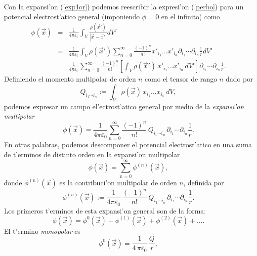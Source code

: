 Con la expansi'on (\ref{exp1or}) podemos reescribir la expresi'on
(\ref{perho}) para un potencial electrost'atico general (imponiendo $\phi=0$ en el infinito) como
\begin{eqnarray}
\phi(\vec x)&=&\frac{1}{4\pi\varepsilon_0}\int_V\frac{\rho(\vec x')}{
\left\vert \vec x-\vec x'\right\vert }dV'\\
&=&\frac{1}{4\pi\varepsilon_0}\int_V \rho(\vec
x')\sum_{n=0}^\infty\frac{(-1)^n}{n!}x'_{i_1}\dots x'_{i_n}\partial_{i_1}\cdots
\partial_{i_n}\frac{1}{r}dV'\\
&=&\frac{1}{4\pi\varepsilon_0}\sum_{n=0}^\infty\frac{(-1)^n}{n!}\left[\int_V
\rho(\vec x')\,x'_{i_1}\dots x'_{i_n}\,dV'\right]\partial_{i_1}\cdots
\partial_{i_n}\frac{1}{r}. \label{phimult}
\end{eqnarray}
Definiendo el momento multipolar de orden $n$ como el tensor de rango $n$ dado
por
\begin{equation}
\boxed{Q_{i_1\cdots i_n}:=\int_V \rho(\vec x)\,x_{i_1}\dots x_{i_n}\,dV,}
\end{equation}
podemos expresar un campo el'ectrost'atico general por medio de la
\textit{expansi'on multipolar}
\begin{equation}
 \boxed{\phi(\vec
x)=\frac{1}{4\pi\varepsilon_0}\sum_{n=0}^\infty\frac{(-1)^n}{n!}\,Q_{ i_1\cdots
i_n}\,\partial_{i_1}\cdots\partial_{i_n}\frac{1}{r}.} \label{phimult2}
\end{equation}
En otras palabras, podemos descomponer el potencial electrost'atico en una suma
de t'erminos de distinto orden en la expansi'on multipolar
\begin{equation}
 \boxed{\phi(\vec{x})=\sum_{n=0}^\infty\phi^{(n)}(\vec{x}),}
\end{equation}
donde $\phi^{(n)}(\vec{x})$ es la contribuci'on multipolar de orden $n$,
definida por
\begin{equation}
\boxed{\phi^{(n)}(\vec{x}):=\frac{1}{4\pi\varepsilon_0}\,\frac{(-1)^n}{n!}\,Q_{
i_1\cdots i_n}\,\partial_{i_1}\cdots\partial_{i_n}\frac{1}{r}.}
\end{equation}
Los primeros t'erminos de esta expansi'on general son de la forma:
\begin{equation} \label{eq3.2.4}
\phi(\vec{x})=\phi^0(\vec{x})+\phi^{(1)}(\vec{x})+\phi^{(2)}(\vec{x})+
\ldots.
\end{equation}
El t'ermino {\em monopolar} es
\begin{equation} \label{eq3.2.5}
\phi^0(\vec{x})=\frac{1}{4\,\pi\varepsilon_0}\,\frac{Q}{r},
\end{equation}
